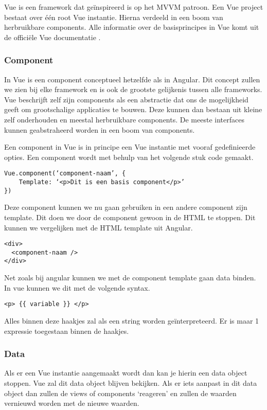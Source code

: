 Vue is een framework dat geïnspireerd is op het MVVM patroon. Een Vue project bestaat over één root Vue instantie. Hierna verdeeld in een boom van herbruikbare components.
Alle informatie over de basisprincipes in Vue komt uit de officiële Vue documentatie \autocite{_vue_2018}.

\subsubsection{Component}
\label{sec:Vue_Component}
In Vue is een component conceptueel hetzelfde als in Angular. Dit concept zullen we zien bij elke framework en is ook de grootste gelijkenis tussen alle frameworks. Vue beschrijft zelf zijn components als een abstractie dat ons de mogelijkheid geeft om grootschalige applicaties te bouwen. Deze kunnen dan bestaan uit kleine zelf onderhouden en meestal herbruikbare components. De meeste interfaces kunnen geabstraheerd worden in een boom van components.

Een component in Vue is in principe een Vue instantie met vooraf gedefinieerde opties. Een component wordt met behulp van het volgende stuk code gemaakt.

\begin{verbatim}
Vue.component(‘component-naam’, {
	Template: ‘<p>Dit is een basis component</p>’
})
\end{verbatim}

Deze component kunnen we nu gaan gebruiken in een andere component zijn template. Dit doen we door de component gewoon in de HTML te stoppen. Dit kunnen we vergelijken met de HTML template uit Angular.

\begin{verbatim}
<div>
  <component-naam />
</div>
\end{verbatim}

Net zoals bij angular kunnen we met de component template gaan data binden. In vue kunnen we dit met de volgende syntax.

\begin{verbatim}
<p> {{ variable }} </p>
\end{verbatim}

Alles binnen deze haakjes zal als een string worden geïnterpreteerd. Er is maar 1 expressie toegestaan binnen de haakjes. 

\subsubsection{Data}
\label{sec:Vue_Data}
Als er een Vue instantie aangemaakt wordt dan kan je hierin een data object stoppen. Vue zal dit data object blijven bekijken. Als er iets aanpast in dit data object dan zullen de views of components ‘reageren’ en zullen de waarden vernieuwd worden met de nieuwe waarden.

